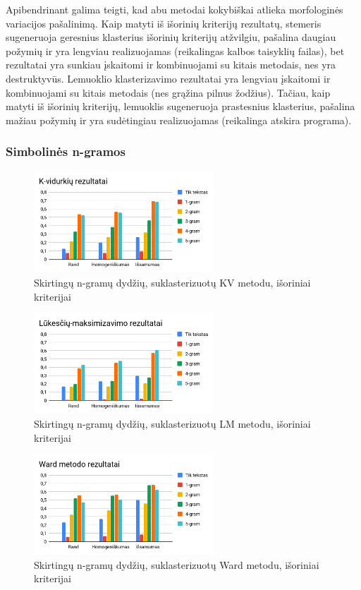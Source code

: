 \documentclass{VUMIFInfBakalaurinis}
\begin{document}
Apibendrinant galima teigti, kad abu metodai kokybiškai atlieka
morfologinės variacijos pašalinimą. Kaip matyti iš išorinių kriterijų
rezultatų, stemeris sugeneruoja geresnius klasterius išorinių kriterijų
atžvilgiu, pašalina daugiau požymių ir yra lengviau realizuojamas
(reikalingas kalbos taisyklių failas), bet rezultatai yra sunkiau
įskaitomi ir kombinuojami su kitais metodais, nes yra destruktyvūs.
Lemuoklio klasterizavimo rezultatai yra lengviau įskaitomi ir
kombinuojami su kitais metodais (nes grąžina pilnus žodžius). Tačiau,
kaip matyti iš išorinių kriterijų, lemuoklis sugeneruoja prastesnius
klasterius, pašalina mažiau požymių ir yra sudėtingiau realizuojamas
(reikalinga atskira programa).

\subsubsection{Simbolinės n-gramos}

\begin{figure}[H]
	\centering
	\includegraphics[width=0.6\textwidth]{./img/image8.png}
  \caption{Skirtingų n-gramų dydžių, suklasterizuotų KV metodu, išoriniai
  kriterijai}
\end{figure}

\begin{figure}[H]
	\centering
	\includegraphics[width=0.6\textwidth]{./img/image24.png}
  \caption{Skirtingų n-gramų dydžių, suklasterizuotų LM metodu, išoriniai
  kriterijai}
\end{figure}

\begin{figure}[H]
	\centering
	\includegraphics[width=0.6\textwidth]{./img/image20.png}
  \caption{Skirtingų n-gramų dydžių, suklasterizuotų Ward metodu, išoriniai
  kriterijai}
\end{figure}
\end{document}
